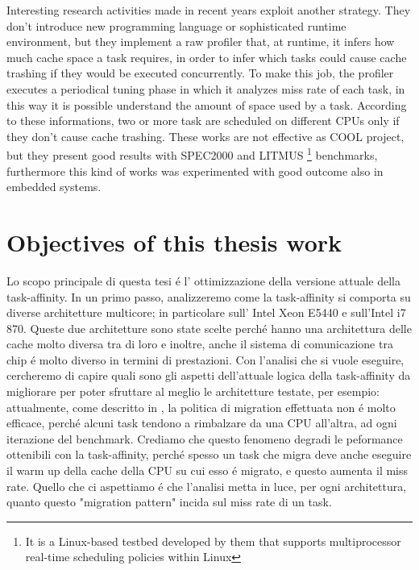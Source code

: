 Interesting research activities made in recent years exploit another strategy. They don't introduce new programming language or sophisticated runtime 
environment, but they implement a raw profiler that, at runtime, it infers how much cache space a task requires, in order to infer which 
tasks could cause cache trashing if they would be executed concurrently.
To make this job, the profiler executes a periodical tuning phase in which it analyzes miss rate of each task, in this way it is possible understand the 
amount of space used by a task. According to these informations, two or more
task are scheduled on different CPUs only if 
they don't cause cache trashing. These works are not effective as COOL project, but they present good results with SPEC2000 and 
LITMUS \footnote{It is a Linux-based testbed developed by them that supports multiprocessor real-time scheduling policies within Linux} benchmarks, 
furthermore this kind of works was experimented with good outcome also in embedded systems.


\section{Objectives of this thesis work}
\label{sec:ObjectiveOfThesis}

Lo scopo principale di questa tesi \'e l' ottimizzazione della versione attuale della task-affinity. In un primo passo, analizzeremo come la task-affinity 
si comporta su diverse architetture multicore; in particolare sull' Intel Xeon E5440 e sull'Intel i7 870. Queste due architetture sono state scelte
perch\'e hanno una architettura delle cache molto diversa tra di loro e inoltre, anche il sistema di comunicazione tra chip \'e molto diverso in termini
di prestazioni. Con l'analisi che si vuole eseguire, cercheremo di capire quali sono gli aspetti dell'attuale logica della task-affinity da migliorare per
poter sfruttare al meglio le architetture testate, per esempio: attualmente, come descritto in \cite{lcs}, la politica di migration effettuata non \'e 
molto efficace, perch\'e alcuni task tendono a rimbalzare da una CPU all'altra, ad ogni iterazione del benchmark. Crediamo che questo fenomeno degradi
le peformance ottenibili con la task-affinity, perch\'e spesso un task che migra deve anche eseguire il warm up della cache della CPU su cui esso \'e
migrato, e questo aumenta il miss rate. Quello che ci aspettiamo \'e che l'analisi metta in luce, per ogni architettura, quanto questo "migration pattern" 
incida sul miss rate di un task.

